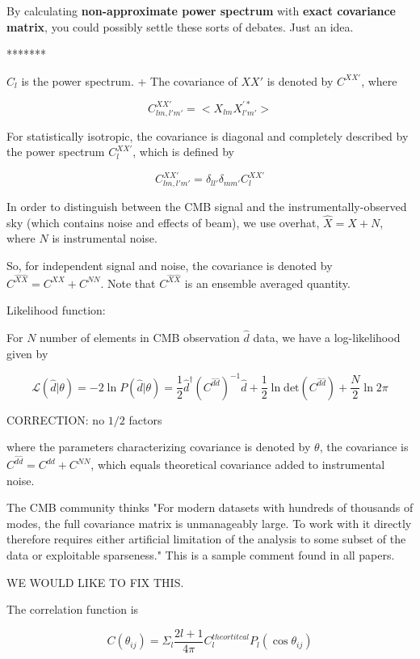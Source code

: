 \documentclass[a4paper, 11pt]{article}
\begin{document}
By calculating \textbf{non-approximate power spectrum} with \textbf{exact covariance matrix}, you could possibly settle these sorts of debates. Just an idea.


*******

$C_l$ is the power spectrum. 
+
The covariance of $XX'$ is denoted by $C^{XX'}$, where

$$
C^{XX'}_{lm,l'm'}=<X_{lm}X^{'*}_{l'm'}>
$$

For statistically isotropic, the covariance is diagonal and completely described by the power spectrum $C^{XX'}_l$, which is defined by 

$$
C^{XX'}_{lm,l'm'}=\delta_{ll'}\delta_{mm'}C^{XX'}_{l}
$$

In order to distinguish between the CMB signal and the instrumentally-observed sky (which contains noise and effects of beam), we use overhat, $\hat{X}=X+N$, where $N$ is instrumental noise. 

So, for independent signal and noise, the covariance is denoted by $C^{\hat{X}\hat{X}}=C^{XX}+C^{NN}$. Note that $C^{\hat{X}\hat{X}}$ is an ensemble averaged quantity.



Likelihood function: 

For $N$ number of elements in CMB observation $\hat{d}$ data, we have a log-likelihood given by

$$
\mathcal{L}(\hat{d}|\theta)=-2 \ln P(\hat{d}|\theta)=\frac{1}{2}\hat{d}^{\dagger}
(C^{\hat{d}\hat{d}})^{-1}\hat{d}+\frac{1}{2}\ln\text{det}(C^{\hat{d}\hat{d}})+\frac{N}{2}\ln2\pi
$$

CORRECTION: no $1/2$ factors

where the parameters characterizing covariance is denoted by $\theta$, the covariance is $C^{\hat{d}\hat{d}}=C^{dd}+C^{NN}$, which equals theoretical covariance added to instrumental noise. 


The CMB community thinks "For modern datasets with hundreds of thousands of modes, the full covariance matrix is unmanageably large. To work with it directly therefore requires either artificial limitation of the analysis to some subset of the data or exploitable sparseness." This is a sample comment found in all papers. 

WE WOULD LIKE TO FIX THIS. 



The correlation function is 

$$
C(\theta_{ij})=\Sigma_l\frac{2l+1}{4\pi}C^{theortitcal}_l P_l(\cos\theta_{ij})
$$
\end{document}
